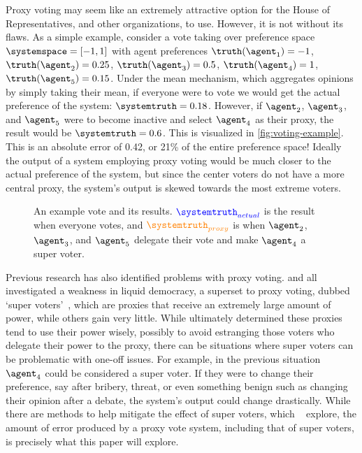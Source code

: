Proxy voting may seem like an extremely attractive option for the House of
Representatives, and other organizations, to use.
However, it is not without its flaws.
As a simple example, consider a vote taking over preference
space $\systemspace = [-1, 1]$ with agent preferences $\truthof{\agent_1} = -1$,
$\truthof{\agent_2} = 0.25$, $\truthof{\agent_3} = 0.5$, $\truthof{\agent_4} = 1$,
$\truthof{\agent_5} = 0.15$.
Under the mean mechanism, which aggregates opinions by simply taking their mean, if
everyone were to vote we would get the actual preference of the
system: $\systemtruth = 0.18$.
However, if $\agent_2$, $\agent_3$, and $\agent_5$ were to become inactive and select
$\agent_4$ as their proxy, the result would be $\systemtruth = 0.6$.
This is visualized in \autoref{fig:voting-example}.
This is an absolute error of 0.42, or 21\% of the entire preference space!
Ideally the output of a system employing proxy voting would be much closer to the
actual preference of the system, but since the center voters do not have a more
central proxy, the system's output is skewed towards the most extreme voters.

\begin{figure}[htbp]
    \centering
    
    \caption{
        An example vote and its results.
        $\textcolor{blue}{\systemtruth_{actual}}$ is the result when everyone votes,
        and $\textcolor{orange}{\systemtruth_{proxy}}$ is when $\agent_2$, $\agent_3$,
        and $\agent_5$ delegate their vote and make $\agent_4$ a super voter.
    }
    \label{fig:voting-example}
\end{figure}

Previous research has also identified problems with proxy voting.
 and  all investigated a weakness in liquid democracy, a
superset to proxy voting, dubbed `super voters'~\cite{Kling2015,Golz2021}, which are
proxies that receive an extremely large amount of power, while others gain very little.
While  ultimately determined these proxies tend to use their power
wisely, possibly to avoid estranging those voters who delegate their power to the
proxy, there can be situations where super voters can be problematic with one-off
issues.
For example, in the previous situation $\agent_4$ could be considered a super voter.
If they were to change their preference, say after bribery, threat, or even
something benign such as changing their opinion after a debate, the system's output
could change drastically.
While there are methods to help mitigate the effect of super voters, which
~\cite{Golz2021} explore, the amount of error produced by a proxy vote
system, including that of super voters, is precisely what this paper will explore.


